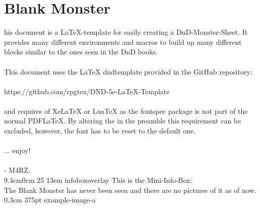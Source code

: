 \documentclass[letterpaper,openany,twoside,twocolumn]{book}
\begin{document}

\MonsterSheetGeometry

\mainmatter%


\chapter*{Blank Monster}

\entryfont \noindent {}his document is a LaTeX-template for easily creating a DnD-Monster-Sheet. It provides many different environments and macros to build up many different blocks similar to the ones seen in the DnD books.\\\\
This document uses the LaTeX dnd\textunderscore template provided in the GitHub repository:\\\\ https://github.com/rpgtex/DND-5e-LaTeX-Template\\\\ and requires of XeLaTeX or LuaTeX as the fontspec package is not part of the normal PDFLaTeX. By altering the \entryfont in the preamble this requirement can be excluded, however, the font has to be reset to the default one. \\\\
... enjoy!\\\\
- M4RZ.\\

\MonsterGraphicAndShortInfo%
	{9.4cm}{0cm}%
	{25}%
	{13em}%
	{infoboxoverlay} %
	{This is the Mini-Info-Box:\\The Blank Monster has never been seen and there are no pictures of it as of now.}%
	{0.3cm}%
	{375pt}%
	{example-image-a}%
\end{document}
